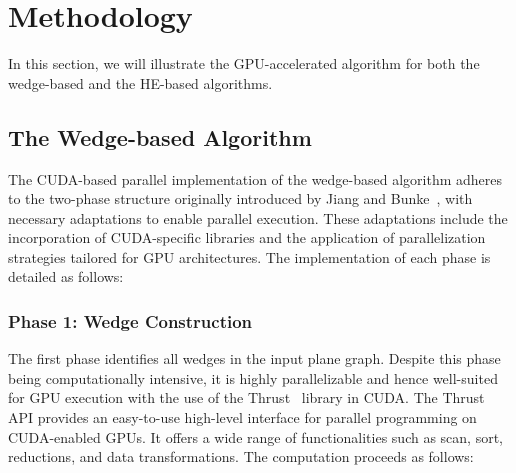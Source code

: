 \section{Methodology}
In this section, we will illustrate the GPU-accelerated algorithm for both the wedge-based and the HE-based algorithms.  

\subsection{The Wedge-based Algorithm}
The CUDA-based parallel implementation of the wedge-based algorithm adheres to the two-phase structure originally introduced by Jiang and Bunke~\cite{JIANG1993553}, with necessary adaptations to enable parallel execution. These adaptations include the incorporation of CUDA-specific libraries and the application of parallelization strategies tailored for GPU architectures. The implementation of each phase is detailed as follows:

\subsubsection{Phase 1: Wedge Construction}
The first phase identifies all wedges in the input plane graph. Despite this phase being computationally intensive, it is highly parallelizable and hence well-suited for GPU execution with the use of the Thrust~\cite{BELL2012359} library in CUDA. The Thrust API provides an easy-to-use high-level interface for parallel programming on CUDA-enabled GPUs. It offers a wide range of functionalities such as scan, sort, reductions, and data transformations. 
The computation proceeds as follows:

